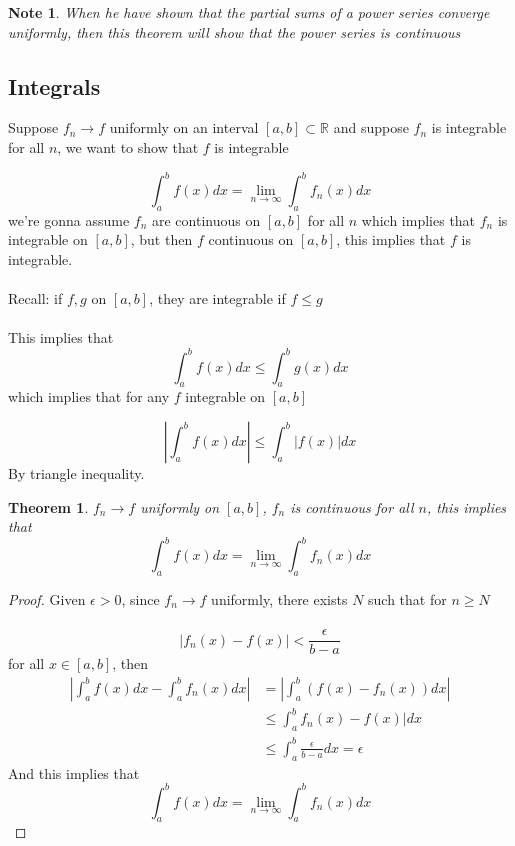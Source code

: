 \documentclass[12pt]{article}
\theoremstyle{plain}
\newtheorem*{note}{Note}
\newtheorem{theorem}{Theorem}[section]
\theoremstyle{definition}
\begin{document}
\begin{note}
	When he have shown that the partial sums of a power series converge uniformly, then this theorem will show that the power series is continuous
\end{note}

\subsection{Integrals}

Suppose $f_n \to f$ uniformly on an interval $[a,b]\subset\mathbb{R}$ and suppose $f_n$ is integrable for all $n$, we want to show that $f$ is integrable

$$\int^b_a f(x) dx = \lim_{n\to\infty} \int^b_a f_n (x) dx$$
we're gonna assume $f_n$ are continuous on $[a,b]$ for all $n$ which implies that $f_n$ is integrable on $[a,b]$, but then $f$ continuous on $[a,b]$, this implies that $f$ is integrable.
\\
\\
Recall: if $f,g$ on $[a,b]$, they are integrable if $f \leq g$\\
\\
This implies that
$$\int^b_a f(x) dx \leq \int^b_a g(x) dx$$
which implies that for any $f$ integrable on $[a,b]$

$$|\int^b_a f(x) dx| \leq \int^b_a |f(x)| dx$$
By triangle inequality.

\begin{theorem}
	$f_n \to f$ uniformly on $[a,b]$, $f_n$ is continuous for all $n$, this implies that
	$$\int^b_a f(x) dx = \lim_{n\to\infty} \int^b_a f_n (x) dx$$
\end{theorem}

\begin{proof}
	Given $\epsilon > 0$, since $f_n \to f$ uniformly, there exists $N$ such that for $n \geq N$\\
	\\
	$$|f_n (x) - f(x)| < \frac{\epsilon}{b-a}$$
	for all $x\in [a,b]$, then
	\begin{align*}
		|\int^b_a f(x) dx - \int^b_a f_n(x) dx| &= |\int^b_a (f(x)-f_n (x)) dx|\\
		 &\leq \int^b_a f_n (x) - f(x)|dx\\
		 &\leq \int^b_a \frac{\epsilon}{b-a} dx = \epsilon
	\end{align*}
	And this implies that
	$$\int^b_a f(x) dx = \lim_{n\to\infty} \int^b_a f_n (x) dx$$

\end{proof}
\end{document}
